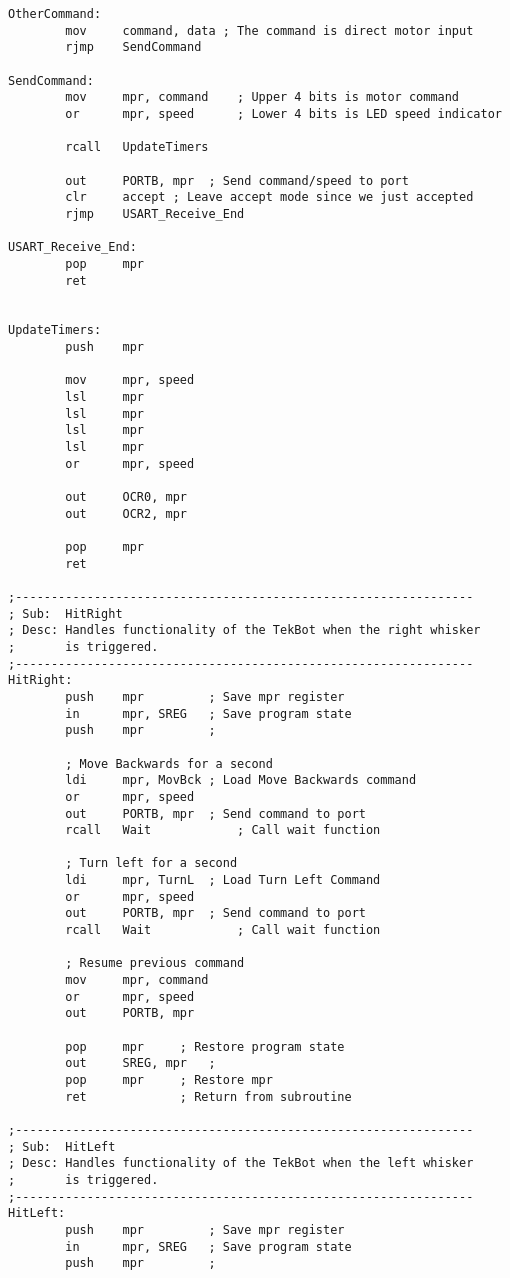 \documentclass[12pt,letterpaper]{article}
\begin{document}
\begin{verbatim}
OtherCommand:
        mov     command, data ; The command is direct motor input
        rjmp    SendCommand

SendCommand:
        mov     mpr, command    ; Upper 4 bits is motor command
        or      mpr, speed      ; Lower 4 bits is LED speed indicator

        rcall   UpdateTimers

        out     PORTB, mpr  ; Send command/speed to port
        clr     accept ; Leave accept mode since we just accepted
        rjmp    USART_Receive_End

USART_Receive_End:
        pop     mpr
        ret


UpdateTimers:
        push    mpr

        mov     mpr, speed
        lsl     mpr
        lsl     mpr
        lsl     mpr
        lsl     mpr
        or      mpr, speed

        out     OCR0, mpr
        out     OCR2, mpr

        pop     mpr
        ret

;----------------------------------------------------------------
; Sub:  HitRight
; Desc: Handles functionality of the TekBot when the right whisker
;       is triggered.
;----------------------------------------------------------------
HitRight:
        push    mpr         ; Save mpr register
        in      mpr, SREG   ; Save program state
        push    mpr         ;

        ; Move Backwards for a second
        ldi     mpr, MovBck ; Load Move Backwards command
        or      mpr, speed
        out     PORTB, mpr  ; Send command to port
        rcall   Wait            ; Call wait function

        ; Turn left for a second
        ldi     mpr, TurnL  ; Load Turn Left Command
        or      mpr, speed
        out     PORTB, mpr  ; Send command to port
        rcall   Wait            ; Call wait function

        ; Resume previous command
        mov     mpr, command
        or      mpr, speed
        out     PORTB, mpr

        pop     mpr     ; Restore program state
        out     SREG, mpr   ;
        pop     mpr     ; Restore mpr
        ret             ; Return from subroutine

;----------------------------------------------------------------
; Sub:  HitLeft
; Desc: Handles functionality of the TekBot when the left whisker
;       is triggered.
;----------------------------------------------------------------
HitLeft:
        push    mpr         ; Save mpr register
        in      mpr, SREG   ; Save program state
        push    mpr         ;


\end{verbatim}
\end{document}
